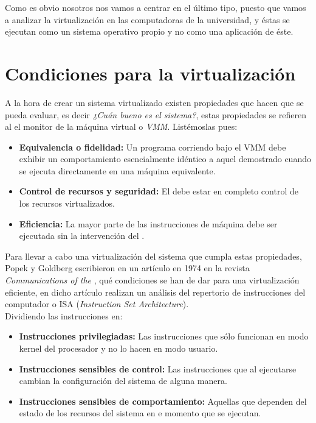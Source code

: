 \noindent Como es obvio nosotros nos vamos a centrar en el último tipo, puesto que vamos a analizar la virtualización en las computadoras de la universidad, y éstas se ejecutan como un sistema operativo propio y no como una aplicación de éste.

\section{Condiciones para la virtualización}

\noindent A la hora de crear un sistema virtualizado existen propiedades que hacen que se pueda evaluar, es decir \emph{¿Cuán bueno es el sistema?}, estas propiedades se refieren al el monitor de la máquina virtual o \emph{VMM}. Listémoslas pues:
\begin{itemize}
\item \textbf{Equivalencia o fidelidad:} Un programa corriendo bajo el VMM debe exhibir un comportamiento  esencialmente idéntico a aquel demostrado cuando se ejecuta directamente en una máquina equivalente.
\item \textbf{Control de recursos y seguridad:} El  debe estar en completo control de los recursos virtualizados.
\item \textbf{Eficiencia:} La mayor parte de las instrucciones de máquina debe ser ejecutada sin la intervención del  .
\end{itemize}

\noindent Para llevar a cabo una virtualización del sistema que cumpla estas propiedades, Popek y Goldberg escribieron en un artículo en 1974 en la revista \emph{Communications of the }\cite{reqvir}, qué condiciones se han de dar para una virtualización eficiente, en dicho artículo realizan un análisis del repertorio de instrucciones del computador o ISA (\emph{Instruction Set Architecture}).\\

\noindent Dividiendo las instrucciones en:
\begin{itemize}
\item \textbf{Instrucciones privilegiadas:} Las instrucciones que sólo funcionan en modo kernel del procesador y no lo hacen en modo usuario.
\item \textbf{Instrucciones sensibles de control:} Las instrucciones que al ejecutarse cambian la configuración del sistema de alguna manera.
\item \textbf{Instrucciones sensibles de comportamiento:} Aquellas que dependen del estado de los recursos del sistema en e momento que se ejecutan. 
\end{itemize}

